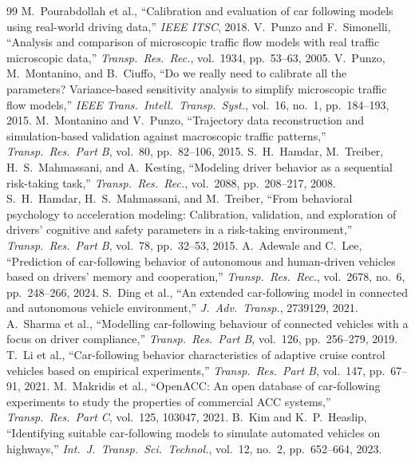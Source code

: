 \documentclass[11pt]{article}
\begin{document}
\begin{thebibliography}{99}
 M.\ Pourabdollah et al., ``Calibration and evaluation
of car following models using real-world driving data,'' \emph{IEEE ITSC}, 2018.
 V.\ Punzo and F.\ Simonelli, ``Analysis and comparison of
microscopic traffic flow models with real traffic microscopic data,''
\emph{Transp.\ Res.\ Rec.}, vol.\ 1934, pp.\ 53--63, 2005.
 V.\ Punzo, M.\ Montanino, and B.\ Ciuffo, ``Do we really need
to calibrate all the parameters? Variance-based sensitivity analysis to simplify
microscopic traffic flow models,'' \emph{IEEE Trans.\ Intell.\ Transp.\ Syst.},
vol.\ 16, no.\ 1, pp.\ 184--193, 2015.
 M.\ Montanino and V.\ Punzo, ``Trajectory data
reconstruction and simulation-based validation against macroscopic traffic
patterns,'' \emph{Transp.\ Res.\ Part B}, vol.\ 80, pp.\ 82--106, 2015.
 S.\ H.\ Hamdar, M.\ Treiber, H.\ S.\ Mahmassani, and A.\
Kesting, ``Modeling driver behavior as a sequential risk-taking task,''
\emph{Transp.\ Res.\ Rec.}, vol.\ 2088, pp.\ 208--217, 2008.
 S.\ H.\ Hamdar, H.\ S.\ Mahmassani, and M.\ Treiber, ``From
behavioral psychology to acceleration modeling: Calibration, validation, and
exploration of drivers' cognitive and safety parameters in a risk-taking
environment,'' \emph{Transp.\ Res.\ Part B}, vol.\ 78, pp.\ 32--53, 2015.
\bibitem{adewale2024} A.\ Adewale and C.\ Lee, ``Prediction of car-following
behavior of autonomous and human-driven vehicles based on drivers' memory and
cooperation,'' \emph{Transp.\ Res.\ Rec.}, vol.\ 2678, no.\ 6, pp.\ 248--266, 2024.
\bibitem{ding2021} S.\ Ding et al., ``An extended car-following model in
connected and autonomous vehicle environment,'' \emph{J.\ Adv.\ Transp.}, 2739129,
2021.
 A.\ Sharma et al., ``Modelling car-following behaviour of
connected vehicles with a focus on driver compliance,'' \emph{Transp.\ Res.\ Part
B}, vol.\ 126, pp.\ 256--279, 2019.
 T.\ Li et al., ``Car-following behavior characteristics of
adaptive cruise control vehicles based on empirical experiments,'' \emph{Transp.\
Res.\ Part B}, vol.\ 147, pp.\ 67--91, 2021.
\bibitem{makridis2021} M.\ Makridis et al., ``OpenACC: An open database of
car-following experiments to study the properties of commercial ACC systems,''
\emph{Transp.\ Res.\ Part C}, vol.\ 125, 103047, 2021.
\bibitem{kim2023} B.\ Kim and K.\ P.\ Heaslip, ``Identifying suitable
car-following models to simulate automated vehicles on highways,'' \emph{Int.\ J.\
Transp.\ Sci.\ Technol.}, vol.\ 12, no.\ 2, pp.\ 652--664, 2023.

\end{thebibliography}
\end{document}
